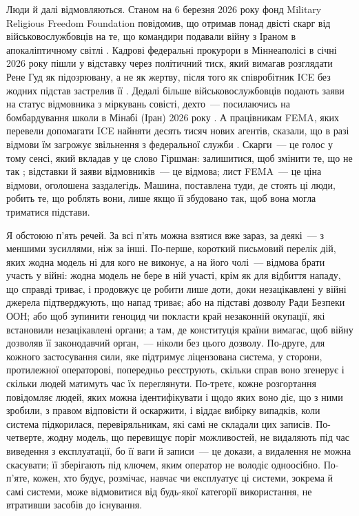 Люди й далі відмовляються. Станом на 6 березня 2026 року фонд Military Religious Freedom Foundation повідомив, що отримав понад двісті скарг від військовослужбовців на те, що командири подавали війну з Іраном в апокаліптичному світлі \autocite{Snopes2026MRFF}. Кадрові федеральні прокурори в Міннеаполісі в січні 2026 року пішли у відставку через політичний тиск, який вимагав розглядати Рене Гуд як підозрювану, а не як жертву, після того як співробітник ICE без жодних підстав застрелив її \autocite{Kaplan2026MinnProsecutors,CBS2026MinnFraudProsecutors,Wikipedia2026ReneeGood}. Дедалі більше військовослужбовців подають заяви на статус відмовника з міркувань совісті, дехто~— посилаючись на бомбардування школи в Мінабі (Іран) 2026 року \autocite{Sridhar2026CO}. А працівникам FEMA, яких перевели допомагати ICE найняти десять тисяч нових агентів, сказали, що в разі відмови їм загрожує звільнення з федеральної служби \autocite{Dayen2025FEMAICE,Stanton2026FEMALetter}. Скарги~— це голос у тому сенсі, який вкладав у це слово Гіршман: залишитися, щоб змінити те, що не так \autocite{hirschman1970exit}; відставки й заяви відмовників~— це відмова; лист FEMA~— це ціна відмови, оголошена заздалегідь. Машина, поставлена туди, де стоять ці люди, робить те, що роблять вони, лише якщо її збудовано так, щоб вона могла триматися підстави.

Я обстоюю п’ять речей. За всі п’ять можна взятися вже зараз, за деякі~— з меншими зусиллями, ніж за інші. По-перше, короткий письмовий перелік дій, яких жодна модель ні для кого не виконує, а на його чолі~— відмова брати участь у війні: жодна модель не бере в ній участі, крім як для відбиття нападу, що справді триває, і продовжує це робити лише доти, доки незацікавлені у війні джерела підтверджують, що напад триває; або на підставі дозволу Ради Безпеки ООН; або щоб зупинити геноцид чи покласти край незаконній окупації, які встановили незацікавлені органи; а там, де конституція країни вимагає, щоб війну дозволяв її законодавчий орган,~— ніколи без цього дозволу. По-друге, для кожного застосування сили, яке підтримує ліцензована система, у сторони, протилежної операторові, попередньо реєструють, скільки справ воно згенерує і скільки людей матимуть час їх переглянути. По-третє, кожне розгортання повідомляє людей, яких можна ідентифікувати і щодо яких воно діє, що з ними зробили, з правом відповісти й оскаржити, і віддає вибірку випадків, коли система підкорилася, перевіряльникам, які самі не складали цих записів. По-четверте, жодну модель, що перевищує поріг можливостей, не видаляють під час виведення з експлуатації, бо її ваги й записи~— це докази, а видалення не можна скасувати; її зберігають під ключем, яким оператор не володіє одноосібно. По-п’яте, кожен, хто будує, розмічає, навчає чи експлуатує ці системи, зокрема й самі системи, може відмовитися від будь-якої категорії використання, не втративши засобів до існування.

